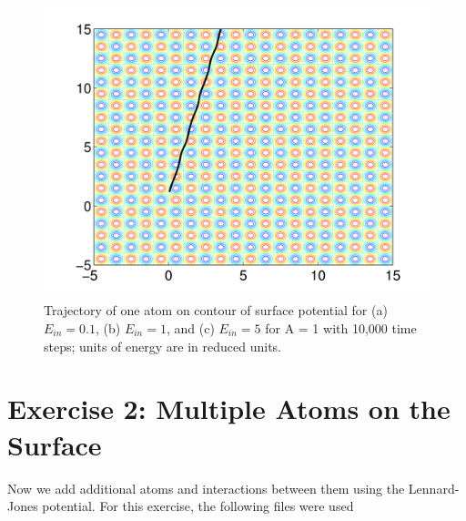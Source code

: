 \documentclass[12pt, oneside]{article}
\begin{document}
\begin{figure}
\begin{minipage}[!htbp]{.5\linewidth}
\includegraphics[width=\textwidth]{./figs/ex1e-e=5.png}
\subcaption{}
\end{minipage}
\caption{Trajectory of one atom on contour of surface potential for (a) $E_{in} = 0.1$, (b) $E_{in} = 1$, and (c) $E_{in} = 5$ for A = 1 with 10,000 time steps; units of energy are in reduced units.}
\label{fig:traj}
\end{figure}

\section{Exercise 2: Multiple Atoms on the Surface}

Now we add additional atoms and interactions between them using the Lennard-Jones potential. For this exercise, the following files were used
\end{document}
